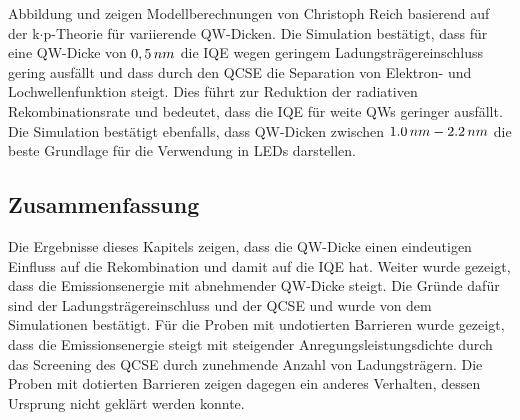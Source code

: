 \noindent 
% 
Abbildung und zeigen Modellberechnungen von Christoph Reich basierend auf der k$\cdot$p-Theorie für variierende QW-Dicken. Die Simulation bestätigt, dass für eine QW-Dicke von $0,5 \thinspace nm$ die IQE wegen geringem Ladungsträgereinschluss gering ausfällt und dass durch den QCSE die Separation von Elektron- und Lochwellenfunktion steigt. Dies führt zur Reduktion der radiativen Rekombinationsrate und bedeutet, dass die IQE für weite QWs geringer ausfällt. Die Simulation bestätigt ebenfalls, dass QW-Dicken zwischen $1.0 \thinspace nm- 2.2 \thinspace nm$ die beste Grundlage für die Verwendung in LEDs darstellen.

\subsection{Zusammenfassung}

Die Ergebnisse dieses Kapitels zeigen, dass die QW-Dicke einen eindeutigen Einfluss auf die Rekombination und damit auf die IQE hat. Weiter wurde gezeigt, dass die Emissionsenergie mit abnehmender QW-Dicke steigt. Die Gründe dafür sind der Ladungsträgereinschluss und der QCSE und wurde von dem Simulationen bestätigt. Für die Proben mit undotierten Barrieren wurde gezeigt, dass die Emissionsenergie steigt mit steigender Anregungsleistungsdichte durch das Screening des QCSE durch zunehmende Anzahl von Ladungsträgern. Die Proben mit dotierten Barrieren zeigen dagegen ein anderes Verhalten, dessen Ursprung nicht geklärt werden konnte.   